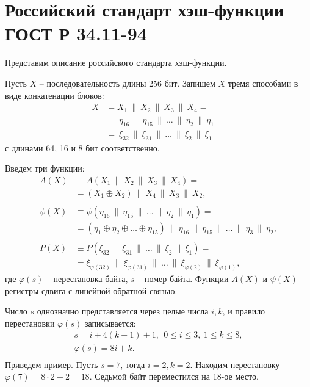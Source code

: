 \section{Российский стандарт хэш-функции ГОСТ Р 34.11-94}

Представим описание российского стандарта хэш-функции.

Пусть $X$ -- последовательность длины 256 бит. Запишем $X$ тремя способами в виде конкатенации блоков:
\[ \begin{array}{ll}
    X & = X_1 ~\|~ X_2 ~\|~ X_3 ~\|~ X_4 = \\
    & = ~ \eta_{16} ~\|~ \eta_{15} ~\|~ \dots ~\|~ \eta_2 ~\|~ \eta_1 = \\
    & = ~ \xi_{32} ~\|~ \xi_{31} ~\|~ \dots ~\|~ \xi_2 ~\|~ \xi_1
\end{array} \]
с длинами 64, 16 и 8 бит соответственно.

Введем три функции:
\[ \begin{array}{ll}
    A(X) & \equiv A(X_1 ~\|~ X_2 ~\|~ X_3 ~\|~ X_4) = \\
        & = \left( X_1 \oplus X_2 \right) ~\|~ X_4 ~\|~ X_3 ~\|~ X_2, \\
    & \\
    \psi(X) & \equiv \psi(\eta_{16} ~\|~ \eta_{15} ~\|~ \dots ~\|~ \eta_2 ~\|~ \eta_1) = \\
        & = \left( \eta_1 \oplus \eta_2 \oplus \dots \oplus \eta_{15} \right) ~\|~
            \eta_{16} ~\|~ \eta_{15} ~\|~ \dots ~\|~ \eta_3 ~\|~ \eta_2, \\
    & \\
    P(X) & \equiv P(\xi_{32} ~\|~ \xi_{31} ~\|~ \dots ~\|~ \xi_2 ~\|~ \xi_1) = \\
        & = \xi_{\varphi(32)} ~\|~ \xi_{\varphi(31)} ~\|~ \dots ~\|~ \xi_{\varphi(2)} ~\|~ \xi_{\varphi(1)},
\end{array} \]
где $\varphi(s)$ -- перестановка байта, $s$ -- номер байта. Функции $A(X)$ и $\psi(X)$ -- регистры сдвига с линейной обратной связью.

Число $s$ однозначно представляется через целые числа $i,k$, и правило перестановки $\varphi(s)$ записывается:
\[ \begin{array}{c}
    s = i + 4 (k - 1) + 1, ~~ 0 \le i \le 3, ~ 1 \le k \le 8, \\
    \varphi(s) = 8 i + k. \\
\end{array} \]
Приведем пример. Пусть $s = 7$, тогда $i=2, k=2$. Находим перестановку $\varphi(7) = 8 \cdot 2 + 2 = 18$. Седьмой байт переместился на 18-ое место.

